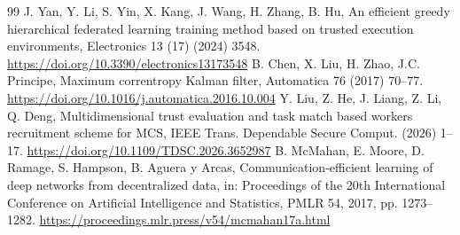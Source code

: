 \documentclass[11pt, a4paper]{article}
\begin{document}
\begin{thebibliography}{99}
     J. Yan, Y. Li, S. Yin, X. Kang, J. Wang, H. Zhang, B. Hu, An efficient greedy hierarchical federated learning training method based on trusted execution environments, Electronics 13 (17) (2024) 3548. \url{https://doi.org/10.3390/electronics13173548}
     B. Chen, X. Liu, H. Zhao, J.C. Principe, Maximum correntropy Kalman filter, Automatica 76 (2017) 70--77. \url{https://doi.org/10.1016/j.automatica.2016.10.004}
     Y. Liu, Z. He, J. Liang, Z. Li, Q. Deng, Multidimensional trust evaluation and task match based workers recruitment scheme for MCS, IEEE Trans. Dependable Secure Comput. (2026) 1--17. \url{https://doi.org/10.1109/TDSC.2026.3652987}
     B. McMahan, E. Moore, D. Ramage, S. Hampson, B. Aguera y Arcas, Communication-efficient learning of deep networks from decentralized data, in: Proceedings of the 20th International Conference on Artificial Intelligence and Statistics, PMLR 54, 2017, pp. 1273--1282. \url{https://proceedings.mlr.press/v54/mcmahan17a.html}

\end{thebibliography}
\end{document}
